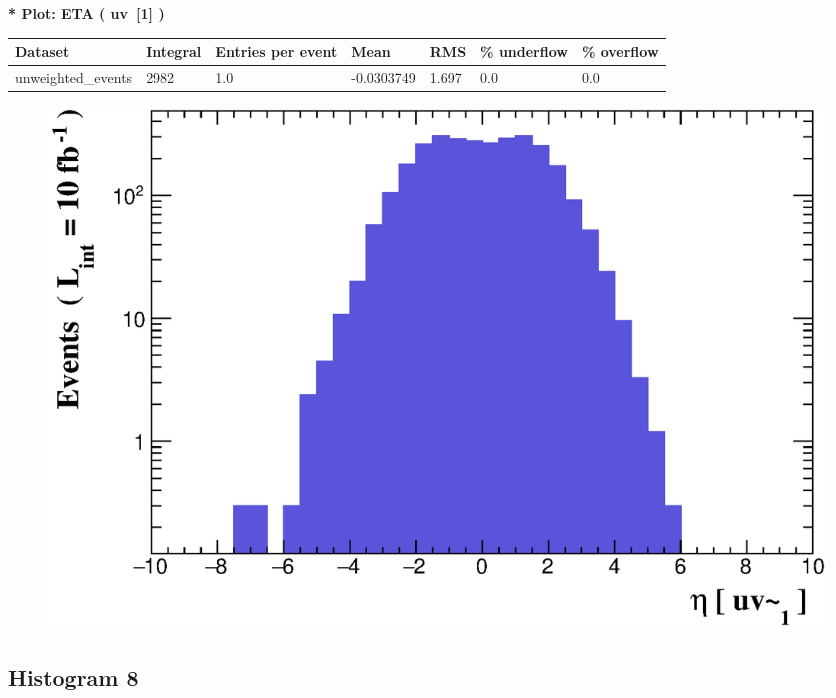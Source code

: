 \documentclass[a4paper, 10pt]{article}
\begin{document}
\textbf{* Plot: ETA ( uv~[1] ) }\\
   \begin{table}[H]
  \begin{center}
    \begin{tabular}{|m{23.0mm}|m{23.0mm}|m{18.0mm}|m{19.0mm}|m{19.0mm}|m{19.0mm}|m{19.0mm}|}
      \hline
      {\cellcolor{yellow}         Dataset}& {\cellcolor{yellow}         Integral}& {\cellcolor{yellow}         Entries per event}& {\cellcolor{yellow}         Mean}& {\cellcolor{yellow}         RMS}& {\cellcolor{yellow}         \% underflow}& {\cellcolor{yellow}         \% overflow}\\
      \hline
      {\cellcolor{white}         unweighted\_events}& {\cellcolor{white}         2982}& {\cellcolor{white}         1.0}& {\cellcolor{white}         -0.0303749}& {\cellcolor{white}         1.697}& {\cellcolor{green}         0.0}& {\cellcolor{green}         0.0}\\
\hline
    \end{tabular}
  \end{center}
\end{table}

\begin{figure}[H]
  \begin{center}
    \includegraphics[scale=0.45]{selection_6.eps}\\
\caption{   }
  \end{center}
\end{figure}
      \newpage
\subsection{ Histogram 8}
\end{document}
